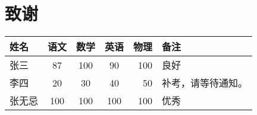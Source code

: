 \documentclass{ctexart}  %
\begin{document}
	\section{致谢}
	

	\begin{tabular}{l||c|c|c|r|p{1.5cm}}
		\hline \hline
		姓名 & 语文 & 数学 & 英语 & 物理 & 备注\\
		\hline \hline
		张三 & 87 &100 & 90 & 100 & 良好\\
		\hline
		李四 & 20 & 30 & 40 & 50 & 补考，请等待通知。\\
		\hline
		张无忌 & 100 & 100 & 100 & 100 & 优秀\\
	\end{tabular}
	
	
\end{document}
